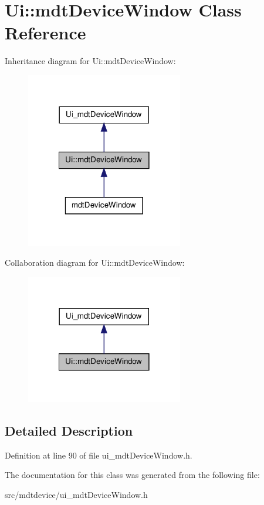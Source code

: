 \hypertarget{class_ui_1_1mdt_device_window}{
\section{Ui::mdtDeviceWindow Class Reference}
\label{class_ui_1_1mdt_device_window}
}


Inheritance diagram for Ui::mdtDeviceWindow:
\nopagebreak
\begin{figure}[H]
\begin{center}
\leavevmode
\includegraphics[width=194pt]{class_ui_1_1mdt_device_window__inherit__graph}
\end{center}
\end{figure}


Collaboration diagram for Ui::mdtDeviceWindow:
\nopagebreak
\begin{figure}[H]
\begin{center}
\leavevmode
\includegraphics[width=194pt]{class_ui_1_1mdt_device_window__coll__graph}
\end{center}
\end{figure}


\subsection{Detailed Description}


Definition at line 90 of file ui\_\-mdtDeviceWindow.h.



The documentation for this class was generated from the following file:\begin{DoxyCompactItemize}
\item 
src/mdtdevice/ui\_\-mdtDeviceWindow.h\end{DoxyCompactItemize}
